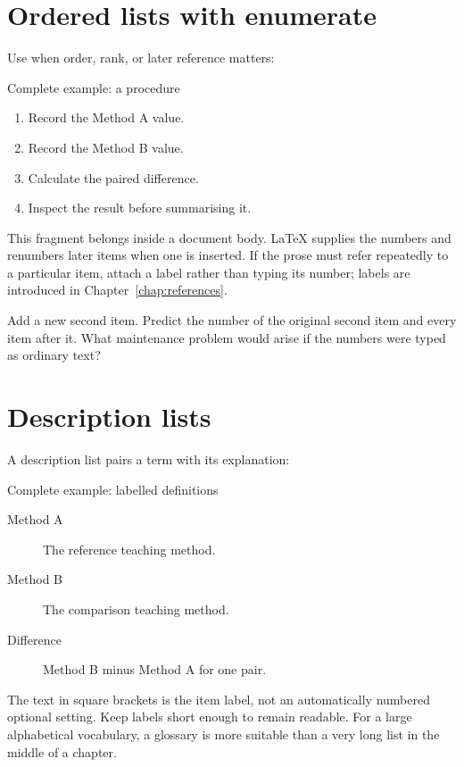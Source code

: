 \section{Ordered lists with enumerate}

Use  when order, rank, or later reference matters:

\begin{latexcode}{Complete example: a procedure}
\begin{enumerate}
  \item Record the Method A value.
  \item Record the Method B value.
  \item Calculate the paired difference.
  \item Inspect the result before summarising it.
\end{enumerate}
\end{latexcode}

This fragment belongs inside a document body. \LaTeX{} supplies the numbers and
renumbers later items when one is inserted. If the prose must refer repeatedly
to a particular item, attach a label rather than typing its number; labels are
introduced in Chapter~\ref{chap:references}.

\begin{pausepredict}
Add a new second item. Predict the number of the original second item and every
item after it. What maintenance problem would arise if the numbers were typed
as ordinary text?
\end{pausepredict}

\section{Description lists}

A description list pairs a term with its explanation:

\begin{latexcode}{Complete example: labelled definitions}
\begin{description}
  \item[Method A] The reference teaching method.
  \item[Method B] The comparison teaching method.
  \item[Difference] Method B minus Method A for one pair.
\end{description}
\end{latexcode}

The text in square brackets is the item label, not an automatically numbered
optional setting. Keep labels short enough to remain readable. For a large
alphabetical vocabulary, a glossary is more suitable than a very long list in
the middle of a chapter.

